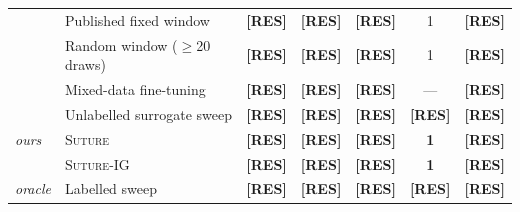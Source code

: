 \documentclass[10pt]{article}
\theoremstyle{plain}
\theoremstyle{definition}
\theoremstyle{remark}
\DeclareRobustCommand{\RES}[1][]{{\color{resred}\textbf{[RES#1]}}}
\newcommand{\ours}{\rowcolor{oursrow}}
\DeclareRobustCommand{\grp}[1]{\textit{\scriptsize #1}}     %
\begin{document}
\begin{center}
\begin{minipage}{\textwidth}
\begin{tabular}{@{}ll cc c cc@{}}
 & Published fixed window        & \RES & \RES & \RES & 1 & \RES \\
 & Random window ($\ge$20 draws) & \RES & \RES & \RES & 1 & \RES \\
 & Mixed-data fine-tuning        & \RES & \RES & \RES & --- & \RES \\
 & Unlabelled surrogate sweep    & \RES & \RES & \RES & \RES & \RES \\
\midrule
\ours \grp{ours} & \textsc{Suture}        & \RES & \RES & \RES & \textbf{1} & \RES \\
\ours            & \textsc{Suture}-IG       & \RES & \RES & \RES & \textbf{1} & \RES \\
\midrule
\grp{oracle}
 & Labelled sweep                & \RES & \RES & \RES & \RES & \RES \\
\bottomrule
\end{tabular}
\end{minipage}
\end{center}
\end{document}
